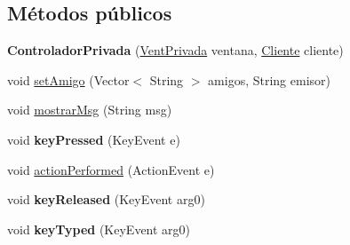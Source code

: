 \subsection*{Métodos públicos}
\begin{DoxyCompactItemize}
\item 
\hypertarget{classcom_1_1ucab_1_1javachat_1_1_cliente_1_1controller_1_1_controlador_privada_ad26e0344a4f4f5db7a6c61452eb3832d}{{\bfseries Controlador\-Privada} (\hyperlink{classcom_1_1ucab_1_1javachat_1_1_cliente_1_1view_1_1_vent_privada}{Vent\-Privada} ventana, \hyperlink{classcom_1_1ucab_1_1javachat_1_1_cliente_1_1model_1_1_cliente}{Cliente} cliente)}\label{classcom_1_1ucab_1_1javachat_1_1_cliente_1_1controller_1_1_controlador_privada_ad26e0344a4f4f5db7a6c61452eb3832d}

\item 
void \hyperlink{classcom_1_1ucab_1_1javachat_1_1_cliente_1_1controller_1_1_controlador_privada_ae7f5eb2e446616f188a05c98d0e42c17}{set\-Amigo} (Vector$<$ String $>$ amigos, String emisor)
\item 
void \hyperlink{classcom_1_1ucab_1_1javachat_1_1_cliente_1_1controller_1_1_controlador_privada_aad887b1c4f3509dcf6ae8059eaaa8d73}{mostrar\-Msg} (String msg)
\item 
\hypertarget{classcom_1_1ucab_1_1javachat_1_1_cliente_1_1controller_1_1_controlador_privada_a779f6d7bee76a8eba068cb989d983158}{void {\bfseries key\-Pressed} (Key\-Event e)}\label{classcom_1_1ucab_1_1javachat_1_1_cliente_1_1controller_1_1_controlador_privada_a779f6d7bee76a8eba068cb989d983158}

\item 
void \hyperlink{classcom_1_1ucab_1_1javachat_1_1_cliente_1_1controller_1_1_controlador_privada_aa3cecf9f9d16456b9a8443c92d6c3874}{action\-Performed} (Action\-Event e)
\item 
\hypertarget{classcom_1_1ucab_1_1javachat_1_1_cliente_1_1controller_1_1_controlador_privada_abc820be85c010cffce5a09b3d8c7c9d2}{void {\bfseries key\-Released} (Key\-Event arg0)}\label{classcom_1_1ucab_1_1javachat_1_1_cliente_1_1controller_1_1_controlador_privada_abc820be85c010cffce5a09b3d8c7c9d2}

\item 
\hypertarget{classcom_1_1ucab_1_1javachat_1_1_cliente_1_1controller_1_1_controlador_privada_a58b8267317cdb4bc3eb80031f82b5710}{void {\bfseries key\-Typed} (Key\-Event arg0)}\label{classcom_1_1ucab_1_1javachat_1_1_cliente_1_1controller_1_1_controlador_privada_a58b8267317cdb4bc3eb80031f82b5710}

\end{DoxyCompactItemize}


